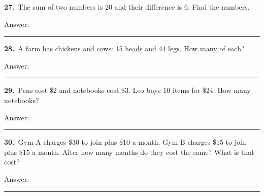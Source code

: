 \documentclass[11pt,letterpaper]{article}
\begin{document}
\needspace{3.9cm}\par\vspace{3mm}\noindent \begin{minipage}[t][3.4cm]{0.48\linewidth}\raggedright{\color{fmturn}\bfseries 27.}\ The sum of two numbers is 20 and their difference is 6. Find the numbers.\par\vfill\hfill Answer:\ \rule{3.2cm}{0.4pt}\end{minipage}\hfill \begin{minipage}[t][3.4cm]{0.48\linewidth}\raggedright{\color{fmturn}\bfseries 28.}\ A farm has chickens and cows: 15 heads and 44 legs. How many of each?\par\vfill\hfill Answer:\ \rule{3.2cm}{0.4pt}\end{minipage}\par
\needspace{3.9cm}\par\vspace{3mm}\noindent \begin{minipage}[t][3.4cm]{0.48\linewidth}\raggedright{\color{fmturn}\bfseries 29.}\ Pens cost \$2 and notebooks cost \$3. Leo buys 10 items for \$24. How many notebooks?\par\vfill\hfill Answer:\ \rule{3.2cm}{0.4pt}\end{minipage}\hfill \begin{minipage}[t][3.4cm]{0.48\linewidth}\raggedright{\color{fmturn}\bfseries 30.}\ Gym A charges \$30 to join plus \$10 a month. Gym B charges \$15 to join plus \$15 a month. After how many months do they cost the same? What is that cost?\par\vfill\hfill Answer:\ \rule{3.2cm}{0.4pt}\end{minipage}\par
\end{document}
